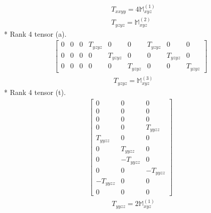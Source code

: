 \documentclass[fleqn,8pt,landscape]{jsarticle}
\begin{document}
\begin{align*}
& T_{xxyy} = 4 \mathbb{M}_{xyz}^{(1)} \\
& T_{yzyz} = \mathbb{M}_{xyz}^{(2)}
\end{align*}
* Rank 4 tensor (a).
\begin{align*}
\begin{bmatrix} 0 & 0 & 0 & T_{yzyz} & 0 & 0 & T_{yzyz} & 0 & 0 \\ 0 & 0 & 0 & 0 & T_{yzyz} & 0 & 0 & T_{yzyz} & 0 \\ 0 & 0 & 0 & 0 & 0 & T_{yzyz} & 0 & 0 & T_{yzyz} \end{bmatrix}
\end{align*}
\begin{align*}
& T_{yzyz} = \mathbb{M}_{xyz}^{(3)}
\end{align*}
* Rank 4 tensor (t).
\begin{align*}
\begin{bmatrix} 0 & 0 & 0 \\ 0 & 0 & 0 \\ 0 & 0 & 0 \\ 0 & 0 & T_{yyzz} \\ T_{yyzz} & 0 & 0 \\ 0 & T_{yyzz} & 0 \\ 0 & - T_{yyzz} & 0 \\ 0 & 0 & - T_{yyzz} \\ - T_{yyzz} & 0 & 0 \\ 0 & 0 & 0 \end{bmatrix}
\end{align*}
\begin{align*}
& T_{yyzz} = 2 \mathbb{M}_{xyz}^{(1)}
\end{align*}
\end{document}
